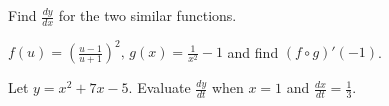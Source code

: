 \begin{questions}
    
    \newpage
    
    \question Find $\displaystyle\frac{dy}{dx}$ for the two similar functions.
    
    
    \question $\displaystyle f(u)=\left(\frac{u-1}{u+1}\right)^2,\, g(x)=\frac{1}{x^2}-1$ and find $(f\circ g)'(-1)$.
    
    
    \question Let $y=x^2+7x-5.$ Evaluate $\displaystyle\frac{dy}{dt}$ when $x=1$ and $\displaystyle\frac{dx}{dt}=\frac{1}{3}$.
    
    

    
\end{questions}


\newpage
